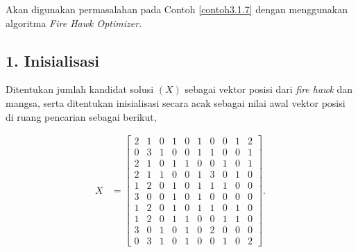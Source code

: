 \begin{contoh}
    Akan digunakan permasalahan pada Contoh \ref{contoh3.1.7} dengan menggunakan algoritma \textit{Fire Hawk Optimizer.}

\subsection*{1. Inisialisasi}
Ditentukan jumlah kandidat solusi $(X)$ sebagai vektor posisi dari \textit{fire hawk} dan mangsa, serta ditentukan inisialisasi secara acak sebagai nilai awal vektor posisi di ruang pencarian sebagai berikut,

\begin{align*}
    X &= \begin{bmatrix}
    2 & 1 & 0 & 1 & 0 & 1 & 0 & 0 & 1 & 2 \\
    0 & 3 & 1 & 0 & 0 & 1 & 1 & 0 & 0 & 1 \\
    2 & 1 & 0 & 1 & 1 & 0 & 0 & 1 & 0 & 1 \\
    2 & 1 & 1 & 0 & 0 & 1 & 3 & 0 & 1 & 0 \\
    1 & 2 & 0 & 1 & 0 & 1 & 1 & 1 & 0 & 0 \\
    3 & 0 & 0 & 1 & 0 & 1 & 0 & 0 & 0 & 0 \\
    1 & 2 & 0 & 1 & 0 & 1 & 1 & 0 & 1 & 0 \\
    1 & 2 & 0 & 1 & 1 & 0 & 0 & 1 & 1 & 0 \\
    3 & 0 & 1 & 0 & 1 & 0 & 2 & 0 & 0 & 0 \\
    0 & 3 & 1 & 0 & 1 & 0 & 0 & 1 & 0 & 2
\end{bmatrix}.
\end{align*}


\end{contoh}
